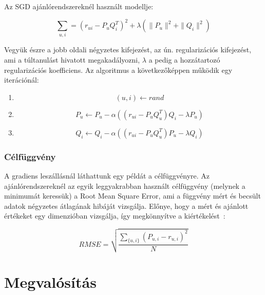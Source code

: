 \documentclass[a4paper,12pt]{article}
\begin{document}
Az SGD ajánlórendszereknél használt modellje:

\[\sum\limits_{u,i} = (r_{ui}-P_{u}Q_{i}^T)^2 + \lambda (\parallel P_{u}\parallel^2 +\parallel Q_{i}\parallel^2)\]
\[\]

Vegyük észre a jobb oldali négyzetes kifejezést, az ún. regularizációs kifejezést, ami a túltanulást hivatott megakadályozni, $\lambda$ a pedig a hozzátartozó regularizációs koefficiens. Az algoritmus a következőképpen működik egy iterációnál: 

\begin{enumerate}
\item \[(u, i) \leftarrow rand \]
\item \[P_{u} \leftarrow P_{u} - \alpha((r_{ui}-P_{u}Q_{u}^T)Q_{i} - \lambda P_{u})\]
\item \[Q_{i} \leftarrow Q_{i} - \alpha((r_{ui}-P_{u}Q_{u}^T)P_{u} - \lambda Q_{i})\]
\end{enumerate}

\subsubsection{Célfüggvény}
A gradiens leszállásnál láthattunk egy példát a célfüggvényre. Az ajánlórendszereknél az egyik leggyakrabban használt célfüggvény (melynek a minimumát keressük) a Root Mean Square Error, ami a függvény mért és becsült adatok négyzetes átlagának hibáját vizsgálja. Előnye, hogy a mért és ajánlott értékeket egy dimenzióban vizsgálja, így megkönnyítve a kiértékelést~\cite{vikas}:  

\[RMSE =   \sqrt{\frac{ \sum_{\{u,i\}} (P_{u,i} - r_{u,i})^2}{N}}\] 

\newpage

\section{Megvalósítás}
\end{document}

